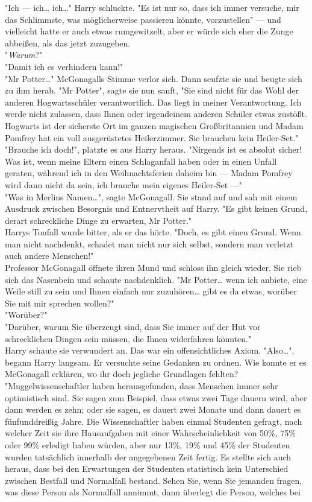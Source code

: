 {"Ich --- ich… ich…" Harry schluckte. "Es ist nur so, dass ich immer versuche, mir das Schlimmste, was möglicherweise passieren könnte, vorzustellen" --- und vielleicht hatte er auch etwas rumgewitzelt, aber er würde sich eher die Zunge abbeißen, als das jetzt zuzugeben.\\ "\emph{Warum}?"\\ "Damit ich es verhindern kann!"\\ "Mr Potter…" McGonagalls Stimme verlor sich. Dann seufzte sie und beugte sich zu ihm herab. "Mr Potter", sagte sie nun sanft, "Sie sind nicht für das Wohl der anderen Hogwartsschüler verantwortlich. Das liegt in meiner Verantwortung. Ich werde nicht zulassen, dass Ihnen oder irgendeinem anderen Schüler etwas zustößt. Hogwarts ist der sicherste Ort im ganzen magischen Großbritannien und Madam Pomfrey hat ein voll ausgerüstetes Heilerzimmer. Sie brauchen kein Heiler-Set."\\ "Brauche ich doch!", platzte es aus Harry heraus. "Nirgends ist es absolut sicher! Was ist, wenn meine Eltern einen Schlaganfall haben oder in einen Unfall geraten, während ich in den Weihnachtsferien daheim bin --- Madam Pomfrey wird dann nicht da sein, ich brauche mein eigenes Heiler-Set ---"\\ "Was in Merlins Namen…", sagte McGonagall. Sie stand auf und sah mit einem Ausdruck zwischen Besorgnis und Entnervtheit auf Harry. "Es gibt keinen Grund, derart schreckliche Dinge zu erwarten, Mr Potter."\\ Harrys Tonfall wurde bitter, als er das hörte. "Doch, es gibt einen Grund. Wenn man nicht nachdenkt, schadet man nicht nur sich selbst, sondern man verletzt auch andere Menschen!"\\ Professor McGonagall öffnete ihren Mund und schloss ihn gleich wieder. Sie rieb sich das Nasenbein und schaute nachdenklich. "Mr Potter… wenn ich anbiete, eine Weile still zu sein und Ihnen einfach nur zuzuhören… gibt es da etwas, worüber Sie mit mir sprechen wollen?"\\ "Worüber?"\\ "Darüber, warum Sie überzeugt sind, dass Sie immer auf der Hut vor schrecklichen Dingen sein müssen, die Ihnen widerfahren könnten."\\ Harry schaute sie verwundert an. Das war ein offensichtliches Axiom. "Also…", begann Harry langsam. Er versuchte seine Gedanken zu ordnen. Wie konnte er es McGonagall erklären, wo ihr doch jegliche Grundlagen fehlten? "Muggelwissenschaftler haben herausgefunden, dass Menschen immer sehr optimistisch sind. Sie sagen zum Beispiel, dass etwas zwei Tage dauern wird, aber dann werden es zehn; oder sie sagen, es dauert zwei Monate und dann dauert es fünfunddreißig Jahre. Die Wissenschaftler haben einmal Studenten gefragt, nach welcher Zeit sie ihre Hausaufgaben mit einer Wahrscheinlichkeit von 50\%, 75\% oder 99\% erledigt haben würden, aber nur 13\%, 19\% und 45\% der Studenten wurden tatsächlich innerhalb der angegebenen Zeit fertig. Es stellte sich auch heraus, dass bei den Erwartungen der Studenten statistisch kein Unterschied zwischen Bestfall und Normalfall bestand. Sehen Sie, wenn Sie jemanden fragen, was diese Person als Normalfall annimmt, dann überlegt die Person, welches bei }
